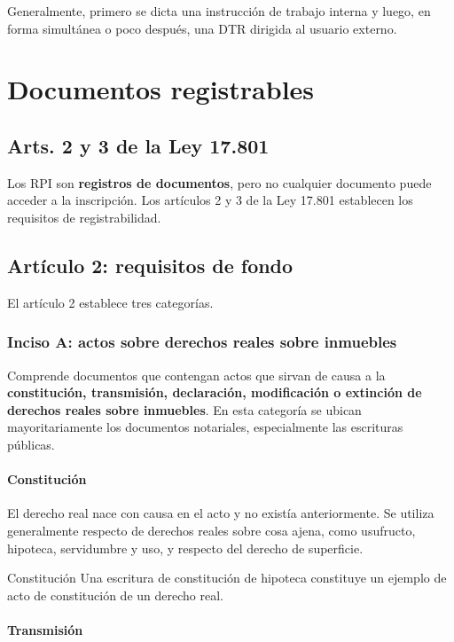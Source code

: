 \documentclass[12pt,oneside]{book}
\begin{document}
Generalmente, primero se dicta una instrucción de trabajo interna y luego, en forma simultánea o poco después, una DTR dirigida al usuario externo.

\chapter{Documentos registrables}

\section{Arts. 2 y 3 de la Ley 17.801}

Los RPI son \textbf{registros de documentos}, pero no cualquier documento puede acceder a la inscripción. Los artículos 2 y 3 de la Ley 17.801 establecen los requisitos de registrabilidad.

\section{Artículo 2: requisitos de fondo}

El artículo 2 establece tres categorías.

\subsection{Inciso A: actos sobre derechos reales sobre inmuebles}

Comprende documentos que contengan actos que sirvan de causa a la \textbf{constitución, transmisión, declaración, modificación o extinción de derechos reales sobre inmuebles}. En esta categoría se ubican mayoritariamente los documentos notariales, especialmente las escrituras públicas.

\subsubsection{Constitución}

El derecho real nace con causa en el acto y no existía anteriormente. Se utiliza generalmente respecto de derechos reales sobre cosa ajena, como usufructo, hipoteca, servidumbre y uso, y respecto del derecho de superficie.

\begin{example}{Constitución}
Una escritura de constitución de hipoteca constituye un ejemplo de acto de constitución de un derecho real.
\end{example}

\subsubsection{Transmisión}
\end{document}
